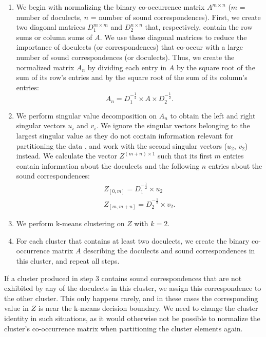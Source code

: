\documentclass[a4paper]{article}
\begin{document}
\begin{enumerate}
\item 
We begin with normalizing the binary co-occurrence matrix
$A^{m \times n}$ ($m$ = number of doculects, $n$ = number of sound correspondences).
First, we create two diagonal matrices
$D_1^{m \times m}$ and $D_2^{n \times n}$ that, respectively,
contain the row sums or column sums of $A$.
We use these diagonal matrices to reduce
the importance of doculects (or correspondences)
that co-occur with a large number
of sound correspondences (or doculects).
Thus, we create the normalized matrix $A_n$
by dividing each entry in $A$ by
the square root of the sum of its row's entries
and by the square root of the sum of its column's entries:
\begin{equation*}
A_n = D_1^{-\frac{1}{2}} \times A \times D_2^{-\frac{1}{2}}.
\end{equation*}

\item
{}
We perform singular value decomposition on $A_n$
to obtain the left and right singular vectors $u_i$ and $v_i$.
We ignore the singular vectors belonging
to the largest singular value as they do not contain
information relevant for partitioning the data \citep{kluger2003spectral},
and work with the second singular vectors ($u_2$, $v_2$) instead.
We calculate the vector $Z^{(m + n) \times 1}$ such that
its first $m$ entries contain information about the doculects
and the following $n$ entries about the sound correspondences:
\begin{align*}
Z_{[0, m]} = D_1^{-\frac{1}{2}} \times u_2\\
Z_{[m, m+n]} = D_2^{-\frac{1}{2}} \times v_2
.
\end{align*}

\item
{}
We perform k-means clustering on $Z$ with $k = 2$.

\item
For each cluster that contains at least two doculects,
we create the binary co-occurrence matrix $A$ describing
the doculects and sound correspondences in this cluster,
and repeat all steps.
\end{enumerate}

If a cluster produced in step 3 contains
sound correspondences that are not exhibited
by any of the doculects in this cluster,
we assign this correspondence to the other cluster.
This only happens rarely, and in these cases the corresponding
value in $Z$ is near the k-means decision boundary.
We need to change the cluster identity in such situations,
as it would otherwise not be possible to normalize
the cluster's co-occurrence matrix when partitioning
the cluster elements again.
\end{document}

